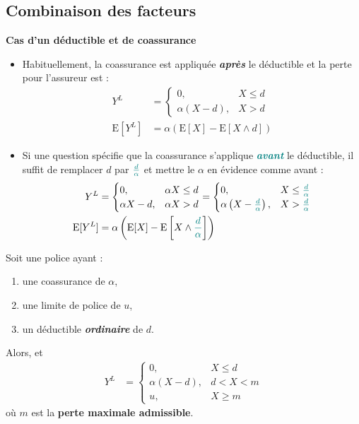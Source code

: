 \documentclass[french]{article}
\begin{document}
\begin{multicols*}{2}
\subsection{Combinaison des facteurs}
\textbf{Cas d'un déductible et de coassurance}
\begin{itemize}
	\item	Habituellement, la coassurance est appliquée \textit{\textbf{après}} le déductible et la perte pour l'assureur est :
		\begin{align*}
		Y^{L}
		&=	\begin{cases}
			0,	&	X \leq d	\\
			\alpha(X - d),	&	X > d
			\end{cases}	\\
		\text{E}[Y^{L}]	
		&=	\alpha\left(\text{E}[X]	-	\text{E}[X \wedge d]	\right)
		\end{align*}
	\item	Si une question spécifie que la coassurance s'applique \textit{\textbf{\textcolor{teal}{avant}}} le déductible, il suffit de remplacer $d$ par $\textcolor{teal}{\frac{d}{\alpha}}$ et mettre le $\alpha$ en évidence comme avant :
		\begin{align*}
		Y^{L}
		&=	\begin{cases}
			0,	&	\alpha X \leq d	\\
			\alpha X - d,	&	\alpha X > d
			\end{cases}	
		=	\begin{cases}
			0,	&	X \leq \textcolor{teal}{\frac{d}{\alpha}}	\\
			\alpha\left(X - \textcolor{teal}{\frac{d}{\alpha}}\right),	&	X > \textcolor{teal}{\frac{d}{\alpha}}
			\end{cases}	\\
		\text{E}[Y^{L}]	
		&=	\alpha\left(\text{E}[X]	-	\text{E}\left[X \wedge \textcolor{teal}{\frac{d}{\alpha}}\right]	\right)
		\end{align*}
\end{itemize}

Soit une police ayant : 
\begin{enumerate}
	\item	une coassurance de $\alpha$,
	\item	une limite de police de $u$,
	\item	un déductible \textit{\textbf{ordinaire}} de $d$.
\end{enumerate}

Alors,  et 
\begin{align*}
	Y^{L}
	&=	\begin{cases}
		0, 	&	X \leq d	\\
		\alpha (X - d), 	&	d < X < m	\\
		u, 	&	X \geq m	
		\end{cases}
\end{align*}
où $m$ est la \textbf{perte maximale admissible}.


\end{multicols*}
\end{document}
